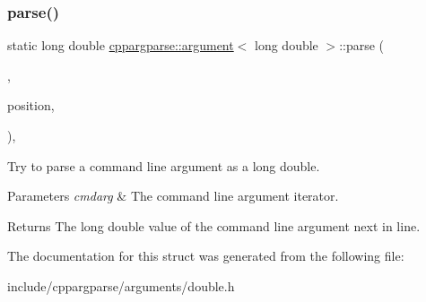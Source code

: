 \subsubsection{\texorpdfstring{parse()}{parse()}}
{\footnotesize\ttfamily static long double \hyperlink{structcppargparse_1_1argument}{cppargparse\+::argument}$<$ long double $>$\+::parse (\begin{DoxyParamCaption}\item[{const types\+::\+Command\+Line\+\_\+t \&}]{,  }\item[{const types\+::\+Command\+Line\+Position\+\_\+t \&}]{position,  }\item[{const types\+::\+Command\+Line\+Arguments\+\_\+t \&}]{ }\end{DoxyParamCaption})\hspace{0.3cm}{\ttfamily [inline]}, {\ttfamily [static]}}



Try to parse a command line argument as a long double. 


\begin{DoxyParams}{Parameters}
{\em cmdarg} & The command line argument iterator.\\
\hline
\end{DoxyParams}
\begin{DoxyReturn}{Returns}
The long double value of the command line argument next in line. 
\end{DoxyReturn}


The documentation for this struct was generated from the following file\+:\begin{DoxyCompactItemize}
\item 
include/cppargparse/arguments/double.\+h\end{DoxyCompactItemize}
